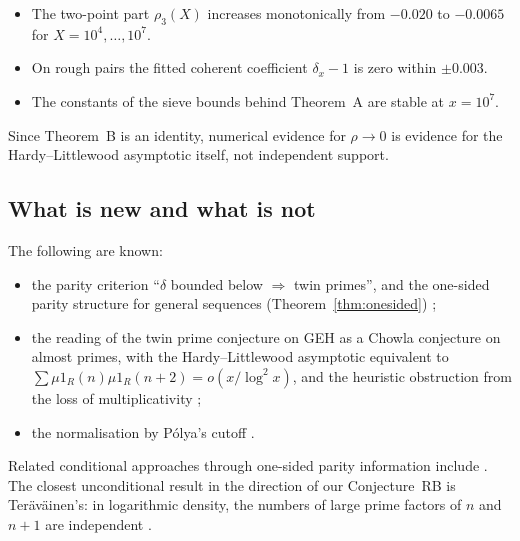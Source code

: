 \documentclass[11pt]{amsart}
\theoremstyle{definition}
\theoremstyle{remark}
\begin{document}
\begin{itemize}
\begin{itemize}
\item The two-point part $\rho_3(X)$ increases monotonically from $-0.020$ to $-0.0065$ for $X=10^4,\dots,10^7$.
\item On rough pairs the fitted coherent coefficient $\delta_x-1$ is zero within $\pm0.003$.
\item The constants of the sieve bounds behind Theorem~A are stable at $x=10^7$.
\end{itemize}
Since Theorem~B is an identity, numerical evidence for $\rho\to0$ is evidence for the Hardy--Littlewood asymptotic itself, not independent support.
\end{itemize}

\subsection{What is new and what is not}
The following are known:
\begin{itemize}
\item the parity criterion ``$\delta$ bounded below $\Rightarrow$ twin primes'', and the one-sided parity structure for general sequences (Theorem~\ref{thm:onesided}) \cite{Bom76,FI78,Tao16notes};
\item the reading of the twin prime conjecture on GEH as a Chowla conjecture on almost primes, with the Hardy--Littlewood asymptotic equivalent to $\sum\mu1_R(n)\mu1_R(n+2)=o(x/\log^2x)$, and the heuristic obstruction from the loss of multiplicativity \cite{Tao16notes};
\item the normalisation by Pólya's cutoff \cite{HL23,Pol59,MW06,BFT23}.
\end{itemize}
Related conditional approaches through one-sided parity information include \cite{MV17,Pin10}. The closest unconditional result in the direction of our Conjecture~RB is Teräväinen's: in logarithmic density, the numbers of large prime factors of $n$ and $n+1$ are independent \cite{Ter18}.
\end{document}
